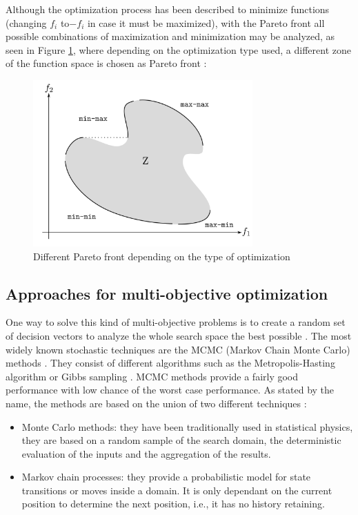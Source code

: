     Although the optimization process has been described to minimize functions (changing $f_i$ to$-f_i$ in  case it must be maximized), with the Pareto front all possible combinations of maximization and minimization may be analyzed, as seen in Figure \ref{fig:maxmaxminmin}, where depending on the optimization type used, a different zone of the function space is chosen as Pareto front \cite{deb2001multi}:
    \begin{figure}[h!]
        \centering
        \includegraphics[width=0.75\textwidth]{Figures/2/maxmaxminmin.png}
        \caption{Different Pareto front depending on the type of optimization}
        \label{fig:maxmaxminmin}
    \end{figure}
    
\newpage

\subsection{Approaches for multi-objective optimization}
    One way to solve this kind of multi-objective problems is to create a random set of decision vectors to analyze the whole search space the best possible \cite{li2012momcmc}. The most widely known stochastic techniques are the MCMC (Markov Chain Monte Carlo) methods \cite{spall2005introduction}. They consist of different algorithms such as the Metropolis-Hasting algorithm \cite{altekar2004parallel} or Gibbs sampling \cite{gilks1992adaptive}. MCMC methods provide a fairly good performance with low chance of the worst case performance. As stated by the name, the methods are based on the union of two different techniques \cite{cleverAlgorithms}:
    \begin{itemize}
        \item Monte Carlo methods: they have been traditionally used in statistical physics, they are based on a random sample of the search domain, the deterministic evaluation of the inputs and the aggregation of the results.
        \item Markov chain processes: they provide a probabilistic model for state transitions or moves inside a domain. It is only dependant on the current position to determine the next position, i.e., it has no history retaining. 
    \end{itemize}
    
